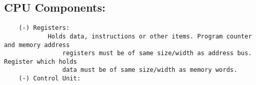 \documentclass{article}
\begin{document}
\subsection*{CPU Components:}
\begin{verbatim}
    (-) Registers:
            Holds data, instructions or other items. Program counter and memory address
                registers must be of same size/width as address bus. Register which holds
                data must be of same size/width as memory words. 
    (-) Control Unit:

\end{verbatim}
\end{document}
